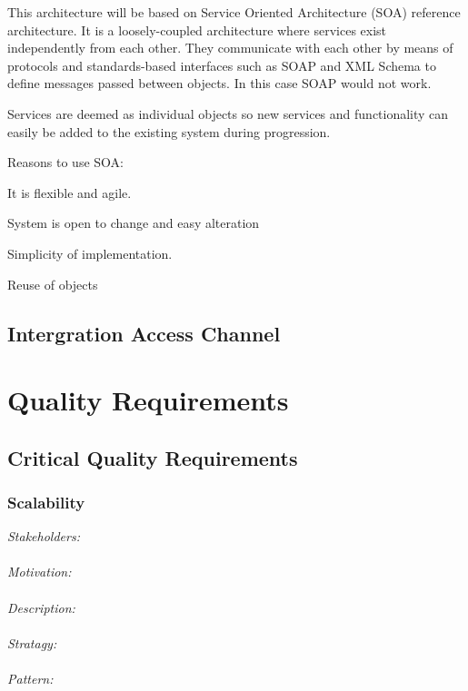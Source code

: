 \documentclass[a4paper,12pt]{report}
\begin{document}
	\begin{description}
\item This architecture will be based on Service Oriented Architecture (SOA) reference architecture. It is a loosely-coupled architecture where services exist independently from each other. They communicate with each other by means of protocols and standards-based interfaces such as SOAP and XML Schema to define messages passed between objects. In this case SOAP would not work.
\item Services are deemed as individual objects so new services and functionality can easily be added to the existing system during progression.
\item Reasons to use SOA:
\item[$\bullet$] It is flexible and agile.
\item[$\bullet$] System is open to change and easy alteration
\item[$\bullet$] Simplicity of implementation.
\item[$\bullet$] Reuse of objects

\end{description}
\subsection{Intergration Access Channel}


\section{Quality Requirements}
	\subsection{Critical Quality Requirements}
		\subsubsection{Scalability}
		\emph{Stakeholders: }\\
		\\\emph{Motivation: }\\
		\\\emph{Description: }\\
		\\\emph{Stratagy: }\\
		\\\emph{Pattern: }\\
			
\end{document}
